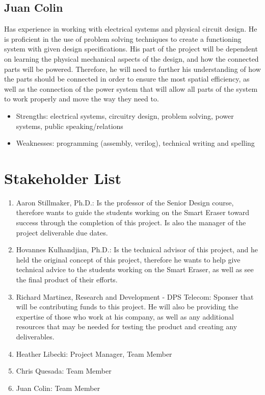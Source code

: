  \subsection{Juan Colin}
  Has experience in working with electrical systems and physical circuit design. He is proficient in the use of problem solving techniques to create a functioning system with given design specifications. His part of the project will be dependent on learning the physical mechanical aspects of the design, and how the connected parts will be powered. Therefore, he will need to further his understanding of how the parts should be connected in order to ensure the most spatial efficiency, as well as the connection of the power system that will allow all parts of the system to work properly and move the way they need to.
  
	\begin{itemize}
	\item Strengths: electrical systems, circuitry design, problem solving, power systems, public speaking/relations
	\item Weaknesses: programming (assembly, verilog), technical writing and spelling \\
\end{itemize}
 
 \section{Stakeholder List}
 \begin{enumerate}
 	\item	Aaron Stillmaker, Ph.D.: Is the professor of the Senior Design course, therefore wants to guide the students working on the Smart Eraser toward success through the completion of this project. Is also the manager of the project deliverable due dates.\\ 
 	\item   Hovannes Kulhandjian, Ph.D.: Is the technical advisor of this project, and he held the original concept of this project, therefore he wants to help give technical advice to the students working on the Smart Eraser, as well as see the final product of their efforts.\\
 	\item	Richard Martinez, Research and Development - DPS Telecom: Sponser that will be contributing funds to this project. He will also be providing the expertise of those who work at his company, as well as any additional resources that may be needed for testing the product and creating any deliverables.\\
 	\item	Heather Libecki: Project Manager, Team Member\\
 	\item	Chris Quesada: Team Member\\
	\item 	Juan Colin: Team Member\\
 	 	
 \end{enumerate}
 
